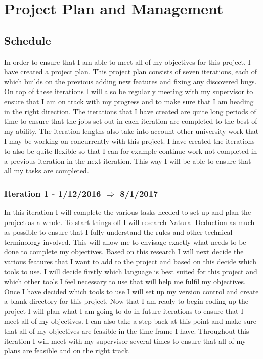 \section{Project Plan and Management}

\subsection{Schedule}

In order to ensure that I am able to meet all of my objectives for this project, I have created a project plan. This project plan consists of seven iterations, each of which builds on the previous adding new features and fixing any discovered bugs. On top of these iterations I will also be regularly meeting with my supervisor to ensure that I am on track with my progress and to make sure that I am heading in the right direction. The iterations that I have created are quite long periods of time to ensure that the jobs set out in each iteration are completed to the best of my ability. The iteration lengths also take into account other university work that I may be working on concurrently with this project. I have created the iterations to also be quite flexible so that I can for example continue work not completed in a previous iteration in the next iteration. This way I will be able to ensure that all my tasks are completed. 


\subsubsection{Iteration 1 - 1/12/2016 $\Rightarrow$ 8/1/2017}

In this iteration I will complete the various tasks needed to set up and plan the project as a whole. To start things off I will research Natural Deduction as much as possible to ensure that I fully understand the rules and other technical terminology involved. This will allow me to envisage exactly what needs to be done to complete my objectives. Based on this research I will next decide the various features that I want to add to the project and based on this decide which tools to use. I will decide firstly which language is best suited for this project and which other tools I feel necessary to use that will help me fulfil my objectives. Once I have decided which tools to use I will set up my version control and create a blank directory for this project. Now that I am ready to begin coding up the project I will plan what I am going to do in future iterations to ensure that I meet all of my objectives. I can also take a step back at this point and make sure that all of my objectives are feasible in the time frame I have. Throughout this iteration I will meet with my supervisor several times to ensure that all of my plans are feasible and on the right track.

